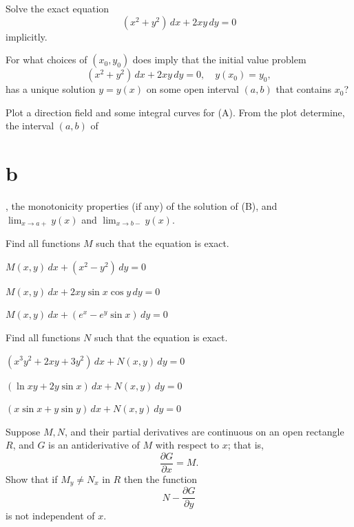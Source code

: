 \begin{exerciselist}
\item\label{exer:2.5.28}\Lex
\begin{alist}
\item %
Solve the exact equation
\[
(x^2+y^2)\,dx+2xy\,dy=0\tag{A}
\]
implicitly.
\item %
For what choices of $(x_0,y_0)$ does
 imply that the initial value problem
\[
(x^2+y^2)\,dx+2xy\,dy=0,\quad y(x_0)=y_0,\tag{B}
\]
has a unique solution $y=y(x)$ on some open interval $(a,b)$
that contains $x_0$?
\item %
Plot a direction field and some integral curves for (A). From
the plot determine,
the  interval $(a,b)$ of \part{b}, the monotonicity
properties (if any) of the solution of (B), and $\lim_{x\to
a+}y(x)$ and $\lim_{x\to b-}y(x)$. 
\end{alist}

\item\label{exer:2.5.29}Find all functions $M$ such that the  equation is exact.
\begin{alist}
\item %
$M(x,y)\,dx+(x^2-y^2)\,dy=0$
\item %
$M(x,y)\,dx+2xy\sin x\cos y\,dy=0$
\item %
$M(x,y)\,dx+(e^x-e^y\sin x)\,dy=0$
\end{alist}

\item\label{exer:2.5.30}Find all functions $N$ such that the  equation is exact.
\begin{alist}
\item %
$(x^3y^2+2xy+3y^2)\,dx+N(x,y)\,dy=0$
\item %
$(\ln xy+2y\sin x)\,dx+N(x,y)\,dy=0$
\item %
$(x\sin x+y\sin y)\,dx+N(x,y)\,dy=0$
\end{alist}

\item\label{exer:2.5.31}Suppose $M,N$, and their partial derivatives are continuous on
an open rectangle
$R$, and $G$ is an antiderivative of $M$ with respect to $x$; that is,
\[
\frac{\partial G}{\partial x}=M.
\]
Show that if $M_y\ne N_x$ in $R$ then the function
\[
 N-\frac{\partial  G}{\partial y}
\]
is not independent of $x$.


\end{exerciselist}
